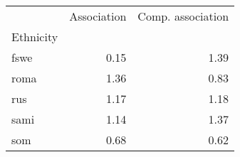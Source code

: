 \begin{tabular}{lrr}
\toprule
{} &  Association &  Comp. association \\
Ethnicity &              &                    \\
\midrule
fswe      &         0.15 &               1.39 \\
roma      &         1.36 &               0.83 \\
rus       &         1.17 &               1.18 \\
sami      &         1.14 &               1.37 \\
som       &         0.68 &               0.62 \\
\bottomrule
\end{tabular}
